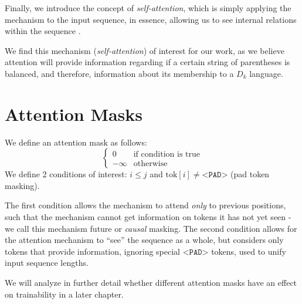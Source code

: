 Finally, we introduce the concept of \emph{self-attention}, which is simply applying the mechanism to the input sequence, in essence, allowing us to see internal relations within the sequence \cite{attention_is_all_you_need}.

We find this mechanism (\emph{self-attention}) of interest for our work, as we believe attention will provide information regarding if a certain string of parentheses is balanced, and therefore, information about its membership to a $D_k$ language.

\section{Attention Masks} \label{section:attn_masks}
We define an attention mask as follows:
\begin{equation}
    \begin{cases}
         0 & \text{if condition is true}  \\
         -\infty & \text{otherwise}
    \end{cases}
\end{equation}
We define 2 conditions of interest: $i\leq j$ and $\text{tok}[i] \neq \texttt{<PAD>}$ (pad token masking).

The first condition allows the mechanism to attend \emph{only} to previous positions, such that the mechanism cannot get information on tokens it has not yet seen - we call this mechanism future or \emph{causal} masking.
The second condition allows for the attention mechanism to ``see'' the sequence as a whole, but considers only tokens that provide information, ignoring special $\texttt{<PAD>}$ tokens, used to unify input sequence lengths.

We will analyze in further detail whether different attention masks have an effect on trainability in a later chapter.
